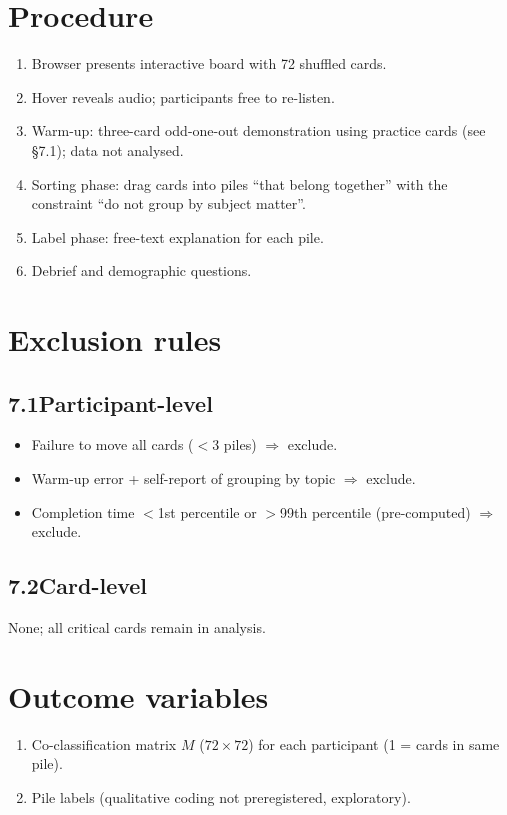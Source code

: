 \documentclass[12pt]{article}
\begin{document}
\section{Procedure}
\begin{enumerate}
\item Browser presents interactive board with 72 shuffled cards.
\item Hover reveals audio; participants free to re-listen.
\item Warm-up: three-card odd-one-out demonstration using practice cards (see §7.1); data not analysed.
\item Sorting phase: drag cards into piles “that belong together” with the constraint “do not group by subject matter”.
\item Label phase: free-text explanation for each pile.
\item Debrief and demographic questions.
\end{enumerate}

\section{Exclusion rules}

\subsection{7.1\quad Participant-level}
\begin{itemize}
\item Failure to move all cards ($<$3 piles) $\Rightarrow$ exclude.
\item Warm-up error + self-report of grouping by topic $\Rightarrow$ exclude.
\item Completion time $<$1st percentile or $>$99th percentile (pre-computed) $\Rightarrow$ exclude.
\end{itemize}

\subsection{7.2\quad Card-level}
None; all critical cards remain in analysis.

\section{Outcome variables}

\begin{enumerate}
\item Co-classification matrix $M$ ($72\times72$) for each participant (1 = cards in same pile).
\item Pile labels (qualitative coding not preregistered, exploratory).
\end{enumerate}
\end{document}
